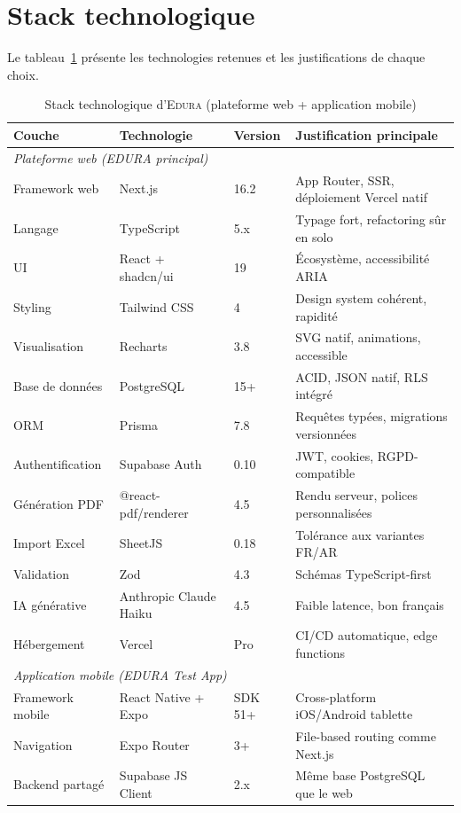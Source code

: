 \documentclass[12pt,a4paper,oneside]{report}
\newcommand{\edura}{\textsc{Edura}}
\begin{document}
\section{Stack technologique}

Le tableau~\ref{tab:stack} présente les technologies retenues et les justifications de chaque choix.

\begin{table}[H]
\centering
\caption{Stack technologique d'\edura{} (plateforme web + application mobile)}
\label{tab:stack}
\begin{tabularx}{\textwidth}{lllX}
\toprule
\textbf{Couche} & \textbf{Technologie} & \textbf{Version} & \textbf{Justification principale} \\
\midrule
\multicolumn{4}{l}{\textit{Plateforme web (EDURA principal)}} \\
Framework web & Next.js & 16.2 & App Router, SSR, déploiement Vercel natif \\
Langage & TypeScript & 5.x & Typage fort, refactoring sûr en solo \\
UI & React + shadcn/ui & 19 & Écosystème, accessibilité ARIA \\
Styling & Tailwind CSS & 4 & Design system cohérent, rapidité \\
Visualisation & Recharts & 3.8 & SVG natif, animations, accessible \\
Base de données & PostgreSQL & 15+ & ACID, JSON natif, RLS intégré \\
ORM & Prisma & 7.8 & Requêtes typées, migrations versionnées \\
Authentification & Supabase Auth & 0.10 & JWT, cookies, RGPD-compatible \\
Génération PDF & @react-pdf/renderer & 4.5 & Rendu serveur, polices personnalisées \\
Import Excel & SheetJS & 0.18 & Tolérance aux variantes FR/AR \\
Validation & Zod & 4.3 & Schémas TypeScript-first \\
IA générative & Anthropic Claude Haiku & 4.5 & Faible latence, bon français \\
Hébergement & Vercel & Pro & CI/CD automatique, edge functions \\
\midrule
\multicolumn{4}{l}{\textit{Application mobile (EDURA Test App)}} \\
Framework mobile & React Native + Expo & SDK 51+ & Cross-platform iOS/Android tablette \\
Navigation & Expo Router & 3+ & File-based routing comme Next.js \\
Backend partagé & Supabase JS Client & 2.x & Même base PostgreSQL que le web \\
\bottomrule
\end{tabularx}
\end{table}
\end{document}
